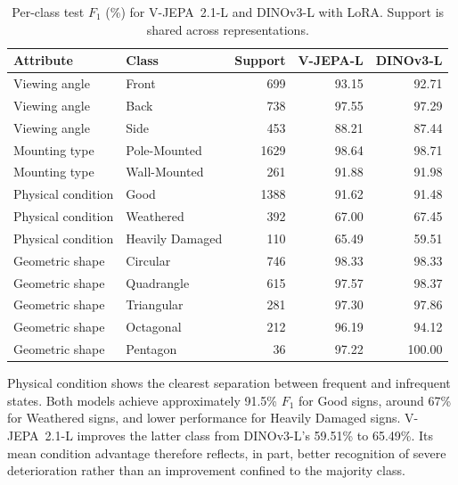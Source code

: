 \begin{table}[htbp]
\centering
\small
\caption{Per-class test $F_1$ (\%) for V-JEPA~2.1-L and DINOv3-L with LoRA. Support is shared across representations.}
\label{tab:ev-attribute-classes}
\renewcommand{\arraystretch}{1.15}
\begin{tabularx}{\textwidth}{@{}>{\raggedright\arraybackslash}X>{\raggedright\arraybackslash}Xrrr@{}}
\toprule
Attribute & Class & Support & V-JEPA-L & DINOv3-L \\
\midrule
Viewing angle & Front & 699 & 93.15 & 92.71 \\
Viewing angle & Back & 738 & 97.55 & 97.29 \\
Viewing angle & Side & 453 & 88.21 & 87.44 \\
Mounting type & Pole-Mounted & 1629 & 98.64 & 98.71 \\
Mounting type & Wall-Mounted & 261 & 91.88 & 91.98 \\
Physical condition & Good & 1388 & 91.62 & 91.48 \\
Physical condition & Weathered & 392 & 67.00 & 67.45 \\
Physical condition & Heavily Damaged & 110 & 65.49 & 59.51 \\
Geometric shape & Circular & 746 & 98.33 & 98.33 \\
Geometric shape & Quadrangle & 615 & 97.57 & 98.37 \\
Geometric shape & Triangular & 281 & 97.30 & 97.86 \\
Geometric shape & Octagonal & 212 & 96.19 & 94.12 \\
Geometric shape & Pentagon & 36 & 97.22 & 100.00 \\
\bottomrule
\end{tabularx}
\end{table}


Physical condition shows the clearest separation between frequent and infrequent states. Both models achieve approximately 91.5\% \(F_1\) for Good signs, around 67\% for Weathered signs, and lower performance for Heavily Damaged signs. V-JEPA~2.1-L improves the latter class from DINOv3-L's 59.51\% to 65.49\%. Its mean condition advantage therefore reflects, in part, better recognition of severe deterioration rather than an improvement confined to the majority class.

